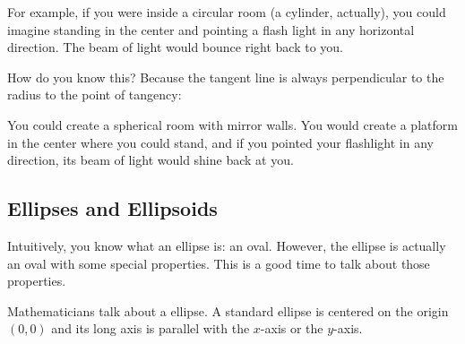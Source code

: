 For example, if you were inside a circular room (a cylinder,
actually), you could imagine standing in the center and pointing a
flash light in any horizontal direction.  The beam of light would
bounce right back to you.


How do you know this?  Because the tangent line is always perpendicular to the radius to the point of tangency:


You could create a spherical room with mirror walls. You would
create a platform in the center where you could stand, and if you
pointed your flashlight in any direction, its beam of light would
shine back at you.

\subsection{Ellipses and Ellipsoids}

Intuitively, you know what an ellipse is: an oval. However, the
ellipse is actually an oval with some special properties.  This is a
good time to talk about those properties.

Mathematicians talk about a  ellipse. A standard ellipse is
centered on the origin $(0,0)$ and its long axis is parallel with the
$x$-axis or the $y$-axis.

